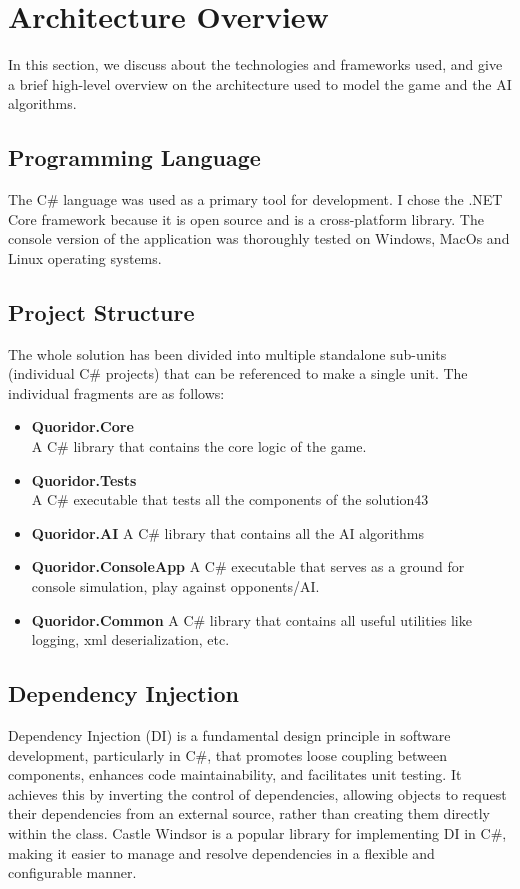 \chapter{Architecture Overview}

In this section, we discuss about the technologies and frameworks used, and give a brief high-level overview on the architecture used to model the game and the AI algorithms.

\section{Programming Language}
The C\# language was used as a primary tool for development. I chose the .NET Core framework because it is open source and is a cross-platform library. The console version of the application was thoroughly tested on Windows, MacOs and Linux operating systems.

\section{Project Structure}
The whole solution has been divided into multiple standalone sub-units (individual C\# projects) that can be referenced to make a single unit. The individual fragments are as follows:

\begin{itemize}
    \item \textbf{Quoridor.Core} \\
    A C\# library that contains the core logic of the game.
    
    \item \textbf{Quoridor.Tests} \\
    A C\# executable that tests all the components of the solution43
    
    \item \textbf{Quoridor.AI}
    A C\# library that contains all the AI algorithms
    
    \item \textbf{Quoridor.ConsoleApp}
    A C\# executable that serves as a ground for console simulation, play against opponents/AI.
    
    \item \textbf{Quoridor.Common}
    A C\# library that contains all useful utilities like logging, xml deserialization, etc.
    
\end{itemize}

\section{Dependency Injection}
Dependency Injection (DI) is a fundamental design principle in software development, particularly in C\#, that promotes loose coupling between components, enhances code maintainability, and facilitates unit testing. It achieves this by inverting the control of dependencies, allowing objects to request their dependencies from an external source, rather than creating them directly within the class. Castle Windsor is a popular library for implementing DI in C\#, making it easier to manage and resolve dependencies in a flexible and configurable manner.

